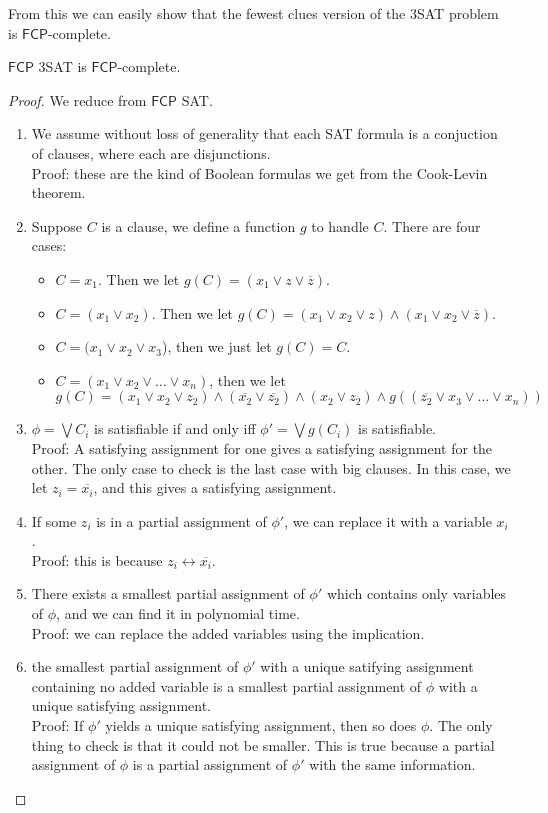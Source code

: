 \documentclass[runningheads,a4paper]{llncs}
\begin{document}
From this we can easily show that the fewest clues version of the 3SAT problem is $\mathsf{FCP}$-complete.

\begin{theorem}
$\mathsf{FCP}$ 3SAT is $\mathsf{FCP}$-complete.
\end{theorem}

\begin{proof}
We reduce from $\mathsf{FCP}$ SAT. 
\begin{enumerate}
\item We assume without loss of generality that each SAT formula is a conjuction of clauses, where each are disjunctions.\\
Proof: these are the kind of Boolean formulas we get from the Cook-Levin theorem.
\item Suppose $C$ is a clause, we define a function $g$ to handle $C$. There are four cases:
\begin{itemize}
\item $C = x_1$. Then we let $g(C) = (x_1 \vee z \vee \overline{z})$.
\item $C = (x_1 \vee x_2)$. Then we let $g(C) = (x_1 \vee x_2 \vee z) \wedge (x_1 \vee x_2 \vee \overline{z})$.
\item $C = (x_1 \vee x_2 \vee x_3$), then we just let $g(C) = C$. 
\item $C = (x_1 \vee x_2 \vee \dots \vee x_n)$, then we let
\[ g(C) = (x_1 \vee x_2 \vee z_2) \wedge (\overline{x_2} \vee \overline{z_2}) \wedge (x_2 \vee z_2) \wedge g((\overline{z_2} \vee x_3 \vee \dots \vee x_n)) \]
\end{itemize}
\item $\phi = \bigvee C_i$ is satisfiable if and only iff $\phi' = \bigvee g(C_i)$ is satisfiable.\\
Proof: A satisfying assignment for one gives a satisfying assignment for the other. The only case to check is the last case with big clauses. In this case, we let $z_i = \overline{x_i}$, and this gives a satisfying assignment.
\item If some $z_i$ is in a partial assignment of $\phi'$, we can replace it with a variable $x_i$. \\
Proof: this is because $z_i \leftrightarrow \overline{x_i}$. 
\item There exists a smallest partial assignment of $\phi'$ which contains only variables of $\phi$, and we can find it in polynomial time. \\
Proof: we can replace the added variables using the implication.
\item the smallest partial assignment of $\phi'$ with a unique satifying assignment containing no added variable is a smallest partial assignment of $\phi$ with a unique satisfying assignment. \\
Proof: If $\phi'$ yields a unique satisfying assignment, then so does $\phi$. The only thing to check is that it could not be smaller. This is true because a partial assignment of $\phi$ is a partial assignment of $\phi'$ with the same information. 
\end{enumerate}
\end{proof}
\end{document}
